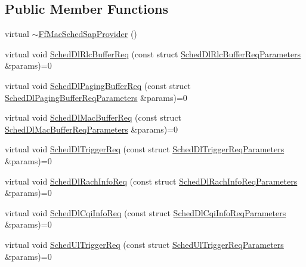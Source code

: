 \subsection*{Public Member Functions}
\begin{DoxyCompactItemize}
\item 
virtual \hyperlink{classns3_1_1FfMacSchedSapProvider_af669f60de88a63d7bb86c27641b432b1}{$\sim$\+Ff\+Mac\+Sched\+Sap\+Provider} ()
\item 
virtual void \hyperlink{classns3_1_1FfMacSchedSapProvider_a24b9bb5cdc5bdfe348806b758c6249d0}{Sched\+Dl\+Rlc\+Buffer\+Req} (const struct \hyperlink{structns3_1_1FfMacSchedSapProvider_1_1SchedDlRlcBufferReqParameters}{Sched\+Dl\+Rlc\+Buffer\+Req\+Parameters} \&params)=0
\item 
virtual void \hyperlink{classns3_1_1FfMacSchedSapProvider_ab124e233544138e199b33085809ba11f}{Sched\+Dl\+Paging\+Buffer\+Req} (const struct \hyperlink{structns3_1_1FfMacSchedSapProvider_1_1SchedDlPagingBufferReqParameters}{Sched\+Dl\+Paging\+Buffer\+Req\+Parameters} \&params)=0
\item 
virtual void \hyperlink{classns3_1_1FfMacSchedSapProvider_aaeba6ad2d3a2ed436f30b04c53689df6}{Sched\+Dl\+Mac\+Buffer\+Req} (const struct \hyperlink{structns3_1_1FfMacSchedSapProvider_1_1SchedDlMacBufferReqParameters}{Sched\+Dl\+Mac\+Buffer\+Req\+Parameters} \&params)=0
\item 
virtual void \hyperlink{classns3_1_1FfMacSchedSapProvider_ae19ae1b9332c0f9b78f616a340b93955}{Sched\+Dl\+Trigger\+Req} (const struct \hyperlink{structns3_1_1FfMacSchedSapProvider_1_1SchedDlTriggerReqParameters}{Sched\+Dl\+Trigger\+Req\+Parameters} \&params)=0
\item 
virtual void \hyperlink{classns3_1_1FfMacSchedSapProvider_af3f033e0a6d29036006e93cf302ea48a}{Sched\+Dl\+Rach\+Info\+Req} (const struct \hyperlink{structns3_1_1FfMacSchedSapProvider_1_1SchedDlRachInfoReqParameters}{Sched\+Dl\+Rach\+Info\+Req\+Parameters} \&params)=0
\item 
virtual void \hyperlink{classns3_1_1FfMacSchedSapProvider_afd94faa752236ee832abdb53f937411b}{Sched\+Dl\+Cqi\+Info\+Req} (const struct \hyperlink{structns3_1_1FfMacSchedSapProvider_1_1SchedDlCqiInfoReqParameters}{Sched\+Dl\+Cqi\+Info\+Req\+Parameters} \&params)=0
\item 
virtual void \hyperlink{classns3_1_1FfMacSchedSapProvider_a7bd978ea17a587a1626ef684be006c04}{Sched\+Ul\+Trigger\+Req} (const struct \hyperlink{structns3_1_1FfMacSchedSapProvider_1_1SchedUlTriggerReqParameters}{Sched\+Ul\+Trigger\+Req\+Parameters} \&params)=0

\end{DoxyCompactItemize}
